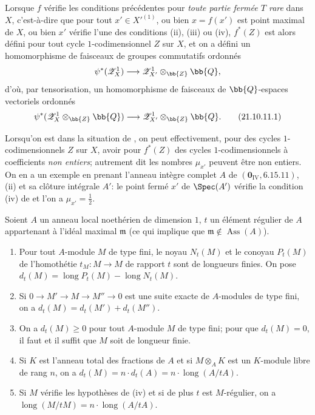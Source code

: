 \begin{env}[21.10.11]
Lorsque $f$ vérifie les conditions précédentes pour \emph{toute partie fermée $T$ rare} dans $X$, c'est-à-dire que pour tout $x'\in X'^{(1)}$, ou bien $x=f(x')$ est point maximal de $X$, ou bien $x'$ vérifie l'une des conditions (ii), (iii) ou (iv), $f^*(Z)$ est alors défini pour tout cycle $1$-codimensionnel $Z$ sur $X$, et on a défini un homomorphisme de faisceaux de groupes commutatifs ordonnés
\[
  \psi^*(\mathscr{Z}^1_X)\to\mathscr{Z}^1_{X'}\otimes_{\bb{Z}}\bb{Q},
\]
d'où, par tensorisation, un homomorphisme de faisceaux de $\bb{Q}$-espaces vectoriels ordonnés
\[
\label{IV.21.10.11.1}
  \psi^*(\mathscr{Z}^1_X\otimes_{\bb{Z}}\bb{Q})\to\mathscr{Z}^1_{X'}\otimes_{\bb{Z}}\bb{Q}.
  \tag{21.10.11.1}
\]
\end{env}

\begin{remark}[21.10.12]
\label{IV.21.10.12}
Lorsqu'on est dans la situation de , on peut effectivement, pour des cycles $1$-codimensionnels $Z$ sur $X$, avoir pour $f^*(Z)$ des cycles $1$-codimensionnels à coefficients \emph{non entiers}; autrement dit les nombres $\mu_{x'}$ peuvent être non entiers.
On en a un exemple en prenant l'anneau intègre complet $A$ de $(\mathbf{0}_{\mathrm{IV}},6.15.11)$, (ii) et sa clôture intégrale $A'$: le point fermé $x'$ de $\Spec(A')$ vérifie la condition (iv) de  et l'on a $\mu_{x'}=\frac12$.
\end{remark}

\begin{lemma}[21.10.13]
\label{IV.21.10.13}
Soient $A$ un anneau local noethérien de dimension $1$, $t$ un élément régulier de $A$ appartenant à l'idéal maximal $\mathfrak{m}$ (ce qui implique que $\mathfrak{m}\notin\operatorname{Ass}(A)$).
\begin{enumerate}[label=(\roman*)]
  \item Pour tout $A$-module $M$ de type fini, le noyau $N_t(M)$ et le conoyau $P_t(M)$ de l'homothétie $t_M:M\to M$ de rapport $t$ sont de longueurs finies. On pose $d_t(M)=\operatorname{long}P_t(M)-\operatorname{long}N_t(M)$.
  \item Si $0\to M'\to M\to M''\to0$ est une suite exacte de $A$-modules de type fini, on a $d_t(M)=d_t(M')+d_t(M'')$.
  \item On a $d_t(M)\geq0$ pour tout $A$-module $M$ de type fini; pour que $d_t(M)=0$, il faut et il suffit que $M$ soit de longueur finie.
  \item Si $K$ est l'anneau total des fractions de $A$ et si $M\otimes_AK$ est un $K$-module libre de rang $n$, on a $d_t(M)=n\cdot d_t(A)=n\cdot\operatorname{long}(A/tA)$.
  \item Si $M$ vérifie les hypothèses de (iv) et si de plus $t$ est $M$-régulier, on a $\operatorname{long}(M/tM)=n\cdot\operatorname{long}(A/tA)$.
\end{enumerate}
\end{lemma}


